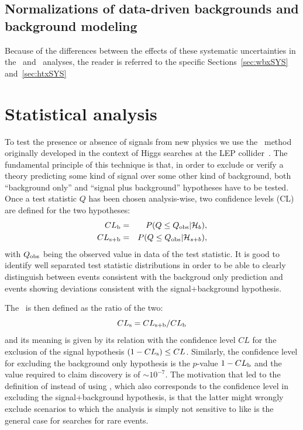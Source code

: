 \subsection{Normalizations of data-driven backgrounds and background modeling}
\label{sec:syst_norm}

Because of the differences between the effects of these systematic uncertainties
in the \wbx\ and \htx\ analyses, the reader is referred to the specific 
Sections~\ref{sec:wbxSYS} and~\ref{sec:htxSYS}


%
%


\section{Statistical analysis}\label{sec:cls}

To test the presence or absence of signals from new physics we use the
\ method~\cite{cls,cls_2} originally developed in the context of Higgs
searches at the LEP collider~\cite{Read:451614}.
The fundamental principle of this technique is that, in order to 
exclude or verify a theory predicting some kind of signal over some other kind
of background, both ``background only'' and ``signal plus background''
hypotheses have to be tested. Once a test statistic $Q$ has been chosen
analysis-wise, two confidence levels (CL) are defined for the two hypotheses:
\begin{eqnarray}\label{eq:clbclsb}
\cls{b} &=& P(Q \leq Q_{\rm obs}|\mathcal{H}_{b}),\\
\cls{s+b} &=& P(Q \leq Q_{\rm obs}|\mathcal{H}_{s+b}),
\end{eqnarray}
with $Q_{\rm obs}$ being the observed value in data of the 
test statistic. It is good to identify well separated test statistic
distributions in order to be able to clearly distinguish between 
events consistent with the backgroud only prediction and events
showing deviations consistent with the signal+background hypothesis.


The \ is then defined as the ratio of the two:
\begin{equation}\label{eq:cls}
\cls{s} = \cls{s+b}/\cls{b}
\end{equation}
and its meaning is given by its relation with the confidence 
level $CL$ for the exclusion of the signal hypothesis 
$(1 - \cls{s}) \leq CL$.
Similarly, the confidence level for excluding the background only
hypothesis is the $p$-value $1 - \cls{b}$ and the value required to claim 
discovery is of $\sim 10^{-7}$. The motivation that led to
the definition of  instead of using , which also
corresponds to the confidence level in excluding the signal+background
hypothesis, is that the latter might wrongly exclude scenarios to
which the analysis is simply not sensitive to like is the general case
for searches for rare events.

